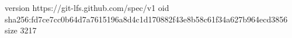 version https://git-lfs.github.com/spec/v1
oid sha256:fd7ce7cc0b64d7a7615196a8d4c1d170882f43e8b58c61f34a627b964ecd3856
size 3217

